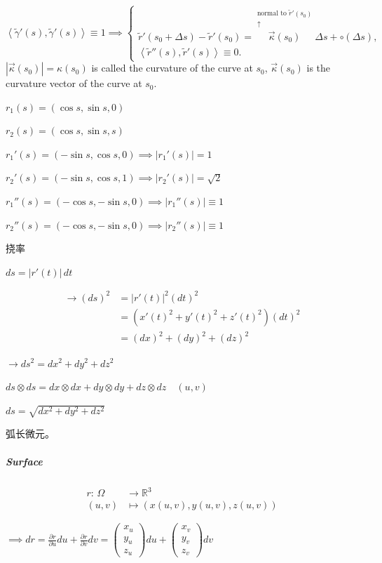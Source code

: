 $$\left\langle\tilde{\gamma}'(s),\tilde{\gamma}'(s)\right\rangle\equiv 1\implies\begin{cases}
        \tilde{r}'(s_0+\Delta s)-\tilde{r}'(s_0)=\overset{\substack{\text{normal to }\tilde{r}'(s_0) \\\uparrow}}{\overrightarrow{\kappa}(s_0)}\Delta s+\circ(\Delta s),\\
        \left\langle\tilde{r}''(s),\tilde{r}'(s)\right\rangle\equiv 0.
    \end{cases}$$
$|\overrightarrow{\kappa}(s_0)|=\kappa(s_0)$ is called the curvature of the curve at $s_0$, $\overrightarrow{\kappa}(s_0)$ is the curvature vector of the curve at $s_0$.

\begin{example}
    $r_1(s)=(\cos s,\sin s,0)$

    $r_2(s)=(\cos s,\sin s,s)$

    $r_1'(s)=(-\sin s,\cos s,0)\implies|r_1'(s)|=1$

    $r_2'(s)=(-\sin s,\cos s,1)\implies|r_2'(s)|=\sqrt{2}$

    $r_1''(s)=(-\cos s,-\sin s,0)\implies|r_1''(s)|\equiv 1$

    $r_2''(s)=(-\cos s,-\sin s,0)\implies|r_2''(s)|\equiv 1$

    挠率
\end{example}

$ds=|r'(t)|\,dt$

\begin{align*}
    \rightarrow(ds)^2 & =|r'(t)|^2(dt)^2                 \\
                      & =(x'(t)^2+y'(t)^2+z'(t)^2)(dt)^2 \\
                      & =(dx)^2+(dy)^2+(dz)^2
\end{align*}

$\rightarrow ds^2=dx^2+dy^2+dz^2$

$ds\otimes ds=dx\otimes dx+dy\otimes dy+dz\otimes dz\quad(u,v)$

$ds=\sqrt{dx^2+dy^2+dz^2}$

弧长微元。

\subparagraph*{Surface}

\begin{align*}
    r:\,\Omega & \to\mathbb{R}^3                \\
    (u,v)      & \mapsto (x(u,v),y(u,v),z(u,v))
\end{align*}

$\implies dr=\frac{\partial r}{\partial u}du+\frac{\partial r}{\partial v}dv=\begin{pmatrix}
        x_u \\y_u\\z_u
    \end{pmatrix}du+\begin{pmatrix}
        x_v \\y_v\\z_v
    \end{pmatrix}dv$

